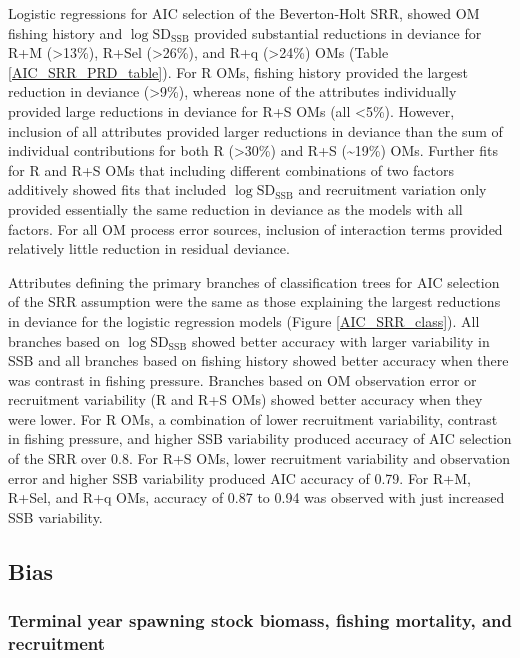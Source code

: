 \documentclass[
  12pt,
]{article}
\begin{document}
Logistic regressions for AIC selection of the Beverton-Holt SRR, showed
OM fishing history and \(\log \text{SD}_{\text{SSB}}\) provided
substantial reductions in deviance for R+M (\textgreater13\%), R+Sel
(\textgreater26\%), and R+q (\textgreater24\%) OMs (Table
\ref{AIC_SRR_PRD_table}). For R OMs, fishing history provided the
largest reduction in deviance (\textgreater9\%), whereas none of the
attributes individually provided large reductions in deviance for R+S
OMs (all \textless5\%). However, inclusion of all attributes provided
larger reductions in deviance than the sum of individual contributions
for both R (\textgreater30\%) and R+S (\textasciitilde19\%) OMs. Further
fits for R and R+S OMs that including different combinations of two
factors additively showed fits that included
\(\log \text{SD}_{\text{SSB}}\) and recruitment variation only provided
essentially the same reduction in deviance as the models with all
factors. For all OM process error sources, inclusion of interaction
terms provided relatively little reduction in residual deviance.

Attributes defining the primary branches of classification trees for AIC
selection of the SRR assumption were the same as those explaining the
largest reductions in deviance for the logistic regression models
(Figure \ref{AIC_SRR_class}). All branches based on
\(\log \text{SD}_{\text{SSB}}\) showed better accuracy with larger
variability in SSB and all branches based on fishing history showed
better accuracy when there was contrast in fishing pressure. Branches
based on OM observation error or recruitment variability (R and R+S OMs)
showed better accuracy when they were lower. For R OMs, a combination of
lower recruitment variability, contrast in fishing pressure, and higher
SSB variability produced accuracy of AIC selection of the SRR over 0.8.
For R+S OMs, lower recruitment variability and observation error and
higher SSB variability produced AIC accuracy of 0.79. For R+M, R+Sel,
and R+q OMs, accuracy of 0.87 to 0.94 was observed with just increased
SSB variability.

\subsection*{Bias}\label{bias-1}

\subsubsection*{Terminal year spawning stock biomass, fishing mortality,
and
recruitment}\label{terminal-year-spawning-stock-biomass-fishing-mortality-and-recruitment}
\end{document}
